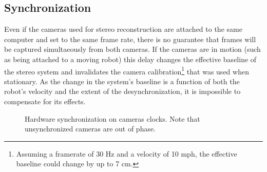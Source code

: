 \documentclass[11pt,twocolumn]{article}
\begin{document}
\subsection{Synchronization}
\label{sec:stereo-sync}
Even if the cameras used for stereo reconstruction are attached to the same
computer and set to the same frame rate, there is no guarantee that frames will
be captured simultaeously from both cameras. If the cameras are in motion (such
as being attached to a moving robot) this delay changes the effective baseline
of the stereo system and invalidates the camera calibration\footnote{Assuming a
framerate of 30 Hz and a velocity of 10 mph, the effective baseline could change
by up to 7 cm.} that was used when stationary. As the change in the system's
baseline is a function of both the robot's velocity and the extent of the
desynchronization, it is impossible to compensate for its effects.

\begin{figure}
	\centering
	\caption{
		Hardware synchronization on cameras clocks. Note that unsynchronized
		cameras are out of phase.
	}
	\label{fig:stereo-sync-hard}
\end{figure}
\end{document}
